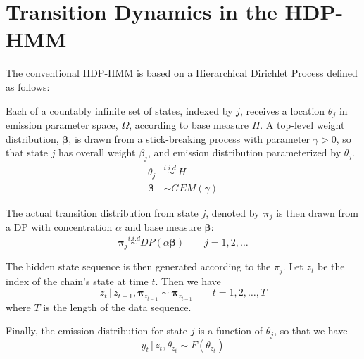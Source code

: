 \documentclass[12pt,letterpaper]{report}
\newcommand{\given}{\, \vert \,}
\newcommand{\bbeta}{\boldsymbol{\beta}}
\newcommand{\bpi}{\boldsymbol{\pi}}
\begin{document}
\section{Transition Dynamics in the HDP-HMM}
\label{sec:transition-dynamics}

The conventional HDP-HMM \citep{teh2006hierarchical} is based on a 
Hierarchical Dirichlet Process defined as follows:

Each of a countably infinite set of states, indexed by $j$, receives a
location $\theta_j$ in emission parameter space, $\Omega$, according to 
base measure $H$.  A top-level
weight distribution, $\bbeta$, is drawn from a stick-breaking
process with parameter $\gamma > 0$, so that state $j$ has overall
weight $\beta_j$, and emission distribution parameterized by $\theta_j$.
\begin{align}
\theta_j &\stackrel{i.i.d.}{\sim} H \\
\bbeta &\sim GEM(\gamma)
\end{align}

The actual transition distribution from state $j$, denoted by $\bpi_j$
is then drawn from a DP with concentration $\alpha$ and base measure $\bbeta$:
\begin{equation}
  \label{eq:1}
  \bpi_j \stackrel{i.i.d}{\sim} DP(\alpha \bbeta) \qquad j = 1, 2, \dots
\end{equation}

The hidden state sequence is then generated according to the $\pi_j$.
Let $z_t$ be the index of the chain's state at time $t$.  Then we have
\begin{equation}
  \label{eq:4}
  z_t \given z_{t-1}, \bpi_{z_{t-1}} \sim \bpi_{z_{t-1}} \qquad t = 1, 2, \dots, T
\end{equation}
where $T$ is the length of the data sequence.

Finally, the emission distribution for state $j$ is a function of
$\theta_j$, so that we have
\begin{equation}
  \label{eq:5}
  y_t \given z_{t}, \theta_{z_t} \sim F(\theta_{z_t})
\end{equation}
\end{document}
